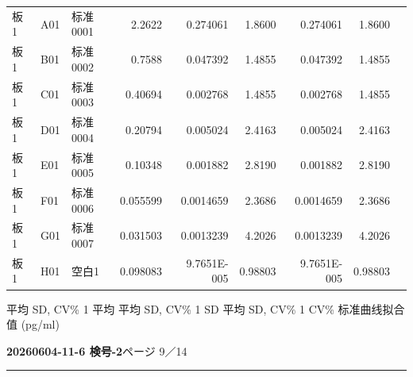 \documentclass[UTF8,10pt,a4paper,fontset=fandol]{ctexart}
\begin{document}
\begin{center}
\scriptsize
\begin{tabular}{l l l r r r r r r}
板 1 & A01 & 标准0001 & 2.2622 & 0.274061 & 1.8600 & 0.274061 & 1.8600 & \\
板 1 & B01 & 标准0002 & 0.7588 & 0.047392 & 1.4855 & 0.047392 & 1.4855 & \\
板 1 & C01 & 标准0003 & 0.40694 & 0.002768 & 1.4855 & 0.002768 & 1.4855 & \\
板 1 & D01 & 标准0004 & 0.20794 & 0.005024 & 2.4163 & 0.005024 & 2.4163 & \\
板 1 & E01 & 标准0005 & 0.10348 & 0.001882 & 2.8190 & 0.001882 & 2.8190 & \\
板 1 & F01 & 标准0006 & 0.055599 & 0.0014659 & 2.3686 & 0.0014659 & 2.3686 & \\
板 1 & G01 & 标准0007 & 0.031503 & 0.0013239 & 4.2026 & 0.0013239 & 4.2026 & \\
板 1 & H01 & 空白1 & 0.098083 & 9.7651E-005 & 0.98803 & 9.7651E-005 & 0.98803 &
\end{tabular}
\end{center}

\noindent
平均 SD, CV\% 1 平均 \quad 平均 SD, CV\% 1 SD \quad 平均 SD, CV\% 1 CV\% \quad 标准曲线拟合值 (pg/ml)

\newpage

\noindent
\textbf{20260604-11-6 検号-2}\hfill ページ 9／14

\vspace{0.3em}
\hrule
\vspace{0.4em}
\end{document}
